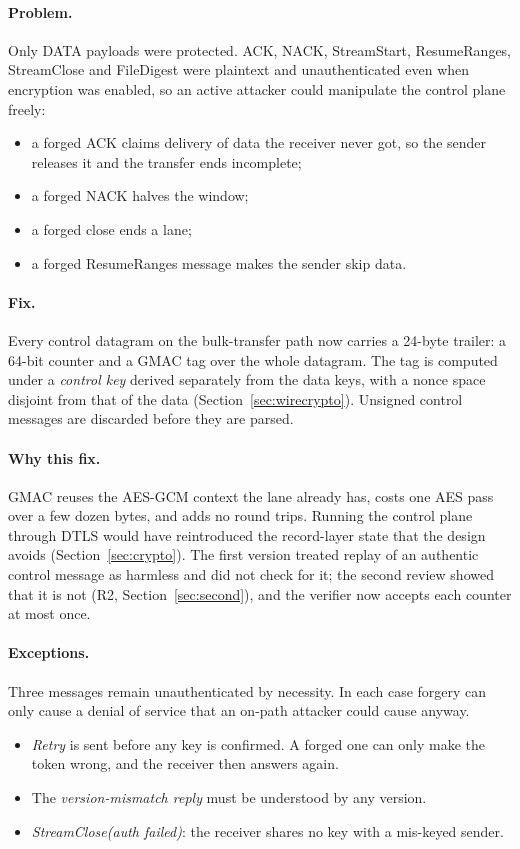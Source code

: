 \paragraph{Problem.} Only DATA payloads were protected. ACK, NACK, StreamStart, ResumeRanges, StreamClose and
FileDigest were plaintext and unauthenticated even when encryption was enabled, so an active attacker could
manipulate the control plane freely:
\begin{itemize}
  \item a forged ACK claims delivery of data the receiver never got, so the sender releases it and the transfer
    ends incomplete;
  \item a forged NACK halves the window;
  \item a forged close ends a lane;
  \item a forged ResumeRanges message makes the sender skip data.
\end{itemize}

\paragraph{Fix.} Every control datagram on the bulk-transfer path now carries a 24-byte trailer: a 64-bit
counter and a GMAC tag over the whole datagram. The tag is computed under a \emph{control key} derived
separately from the data keys, with a nonce space disjoint from that of the data (Section~\ref{sec:wirecrypto}).
Unsigned control messages are discarded before they are parsed.

\paragraph{Why this fix.} GMAC reuses the AES-GCM context the lane already has, costs one AES pass over a few
dozen bytes, and adds no round trips. Running the control plane through DTLS would have reintroduced the
record-layer state that the design avoids (Section~\ref{sec:crypto}). The first version treated replay of an
authentic control message as harmless and did not check for it; the second review showed that it is not (R2,
Section~\ref{sec:second}), and the verifier now accepts each counter at most once.

\paragraph{Exceptions.} Three messages remain unauthenticated by necessity. In each case forgery can only cause
a denial of service that an on-path attacker could cause anyway.
\begin{itemize}
  \item \emph{Retry} is sent before any key is confirmed. A forged one can only make the token wrong, and the
    receiver then answers again.
  \item The \emph{version-mismatch reply} must be understood by any version.
  \item \emph{StreamClose(auth failed)}: the receiver shares no key with a mis-keyed sender.
\end{itemize}

